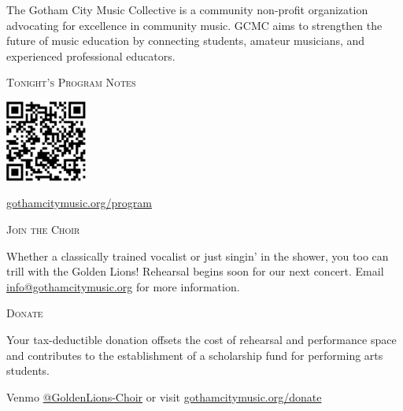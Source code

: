 \documentclass{article}[10pt]
\begin{document}
\begin{titlepage}
\begin{center}
\begin{minipage}{4in}
    
\begin{small}
The Gotham City Music Collective is a community non-profit organization advocating for excellence in community music.
GCMC aims to strengthen the future of music education by connecting students, amateur musicians, and experienced professional educators.
\end{small}

\begin{center}
{\large{\textsc{Tonight's Program Notes}}}\
\vspace{0.1in}

    {\includegraphics[width=0.2\textwidth]{program_url.pdf}}

    \href{https://gothamcitymusic.org/program}{gothamcitymusic.org/program}
\end{center}

\begin{center}
{\large{\textsc{Join the Choir}}}
\end{center}
\vspace{-0.1in}
\begin{small}
Whether a classically trained vocalist or just singin' in the shower, you too can trill with the Golden Lions!
Rehearsal begins soon for our next concert.
Email \href{info@gothamcitymusic.org}{info@gothamcitymusic.org} for more information.
\end{small}

\begin{center}
{\large{\textsc{Donate}}}
\end{center}
\vspace{-0.1in}
\begin{small}
Your tax-deductible donation offsets the cost of rehearsal and performance space and contributes to the establishment of a scholarship fund for performing arts students.\\
\end{small}

Venmo \href{https://account.venmo.com/u/GoldenLions-choir}{@GoldenLions-Choir} or visit \href{https://gothamcitymusic.org/donate}{gothamcitymusic.org/donate}


\end{minipage}
\end{center}
\end{titlepage}
\end{document}
